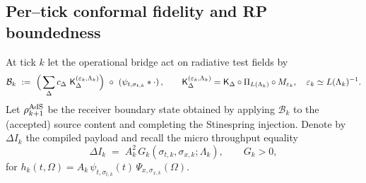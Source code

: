 \documentclass[10pt]{article}
\theoremstyle{definition}
\theoremstyle{plain}
\begin{document}
\subsection{Per–tick conformal fidelity and RP boundedness}
\label{app:tick-fidelity-RP}

At tick $k$ let the operational bridge act on radiative test fields by
\[
\mathcal B_k\ :=\ \Big(\sum_{\Delta} c_\Delta\ {\sf K}_\Delta^{(\varepsilon_k,\Lambda_k)}\Big)\ \circ\ (\psi_{t,\sigma_{t,k}}*\cdot)\,,
\qquad {\sf K}_\Delta^{(\varepsilon_k,\Lambda_k)}={\sf K}_\Delta\circ \Pi_{L(\Lambda_k)}\circ M_{\varepsilon_k},\quad \varepsilon_k\simeq L(\Lambda_k)^{-1}.
\]
Let $\rho_{k+1}^{\rm AdS}$ be the receiver boundary state obtained by applying $\mathcal B_k$ to the (accepted) source content and completing the Stinespring injection. Denote by $\Delta I_k$ the compiled payload and recall the micro throughput equality
\[
\Delta I_k\;=\;A_k^2\,G_k(\sigma_{t,k},\sigma_{x,k};\Lambda_k),\qquad G_k>0,
\]
for $h_k(t,\Omega)=A_k\,\psi_{t,\sigma_{t,k}}(t)\,\Psi_{x,\sigma_{x,k}}(\Omega)$.
\end{document}
